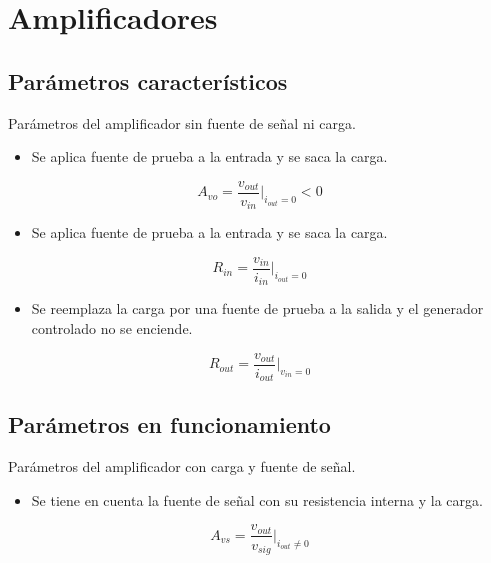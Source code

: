 \section{Amplificadores}

\subsection{Parámetros característicos}
Parámetros del amplificador sin fuente de señal ni carga. 


\begin{itemize}
    \item Se aplica fuente de prueba a la entrada y se saca la  carga.
\end{itemize}
\begin{equation}
    A_{vo} = \frac{v_{out}}{v_{in}}\bigg |_{i_{out} = 0} < 0
\end{equation}

\begin{itemize}
    \item Se aplica fuente de prueba a la entrada y se saca la  carga.
\end{itemize}
\begin{equation}
    R_{in} = \frac{v_{in}}{i_{in}} \bigg |_{i_{out} = 0}
\end{equation}

\begin{itemize}
    \item Se reemplaza la carga por una fuente de prueba a la salida y el generador controlado no se enciende.
\end{itemize}
\begin{equation}
    R_{out} = \frac{v_{out}}{i_{out}} \bigg |_{v_{in} = 0}
\end{equation}


\subsection{Parámetros en funcionamiento}
Parámetros del amplificador con carga y fuente de señal. 

\begin{itemize}
    \item Se tiene en cuenta la fuente de señal con su resistencia interna y la carga.
\end{itemize}
\begin{equation}
    A_{vs} = \frac{v_{out}}{v_{sig}}\Bigg|_{i_{out} \neq 0 }
\end{equation}

